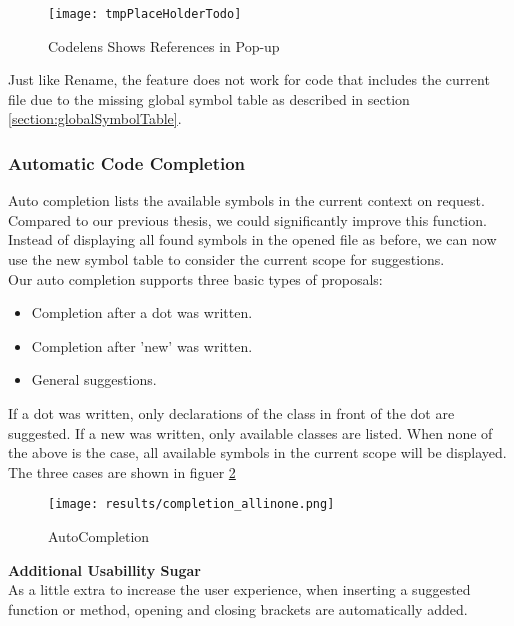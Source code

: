 \begin{figure}[H]
    \centering
    \texttt{[image: tmpPlaceHolderTodo]}
    \caption{Codelens Shows References in Pop-up}
    \label{fig:result_codelens_references_popup}
\end{figure}

Just like Rename, the feature does not work for code that includes the current file
due to the missing global symbol table as described in section \ref{section:globalSymbolTable}.

\subsubsection{Automatic Code Completion}
Auto completion lists the available symbols in the current context on request.
Compared to our previous thesis, we could significantly improve this function.
Instead of displaying all found symbols in the opened file as before,
we can now use the new symbol table to consider the current scope for suggestions. \\

Our auto completion supports three basic types of proposals:
\begin{itemize}
    \item Completion after a dot was written.
    \item Completion after 'new' was written.
    \item General suggestions.
\end{itemize}

If a dot was written, only declarations of the class in front of the dot are suggested.
If a new was written, only available classes are listed.
When none of the above is the case, all available symbols in the current scope will be displayed.
The three cases are shown in figuer \ref{fig:result_completion}

\begin{figure}[H]
    \centering
    \texttt{[image: results/completion\_allinone.png]}
    \caption{AutoCompletion}
    \label{fig:result_completion}
\end{figure}



\textbf{Additional Usabillity Sugar}\\
As a little extra to increase the user experience, when inserting a suggested function or method,
opening and closing brackets are automatically added.

